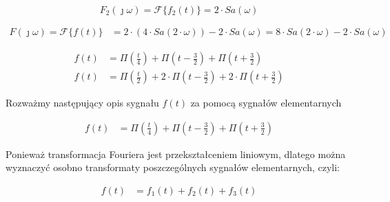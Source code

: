 \begin{task}
\begin{equation}
F_{2}(\jmath \omega) = \mathcal F\{f_{2}(t)\} = 2 \cdot Sa\left(\omega\right)
\end{equation}


\begin{align*}
F(\jmath \omega) = \mathcal F\{f(t)\} &= 2 \cdot \left( 4 \cdot Sa\left(2 \cdot \omega\right)\right) - 2 \cdot Sa\left(\omega\right) = 8 \cdot Sa \left(2 \cdot \omega\right) - 2 \cdot Sa\left(\omega\right)
\end{align*}



\begin{align*}
f(t) &= \Pi\left(\frac{t}{4}\right) + \Pi\left(t - \frac{3}{2}\right) + \Pi\left(t + \frac{3}{2}\right)\\
f(t) &= \Pi\left(\frac{t}{2}\right) + 2 \cdot \Pi\left(t - \frac{3}{2}\right) + 2 \cdot \Pi\left(t + \frac{3}{2}\right)
\end{align*}

Rozważmy następujący opis sygnału $f(t)$ za pomocą sygnałów elementarnych

\begin{align*}
f(t) &= \Pi\left(\frac{t}{4}\right) + \Pi\left(t - \frac{3}{2}\right) + \Pi\left(t + \frac{3}{2}\right)
\end{align*}

Ponieważ transformacja Fouriera jest przekształceniem liniowym, dlatego można wyznaczyć osobno transformaty poszczególnych sygnałów elementarnych, czyli:

\begin{align*}
f(t) &= f_1(t) + f_2(t) + f_3(t)
\end{align*}


\end{task}
